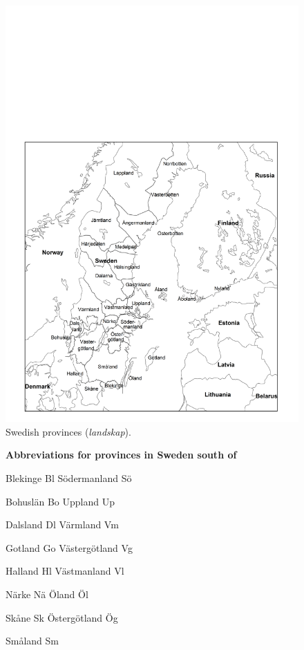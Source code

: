 \begin{figure}[h]

\includegraphics[height=.3\textheight]{figures/5_SwedishProvinces}
\caption{Swedish provinces (\textit{landskap}).}
\label{map:4}

\end{figure}

\begin{figure}[h]

\textbf{Abbreviations for provinces in Sweden south of}

Blekinge  Bl  Södermanland  Sö

Bohuslän  Bo  Uppland  Up

Dalsland  Dl  Värmland  Vm

Gotland  Go  Västergötland  Vg

Halland  Hl  Västmanland  Vl

Närke  Nä  Öland  Öl

Skåne  Sk  Östergötland  Ög

Småland  Sm    

\end{figure}

